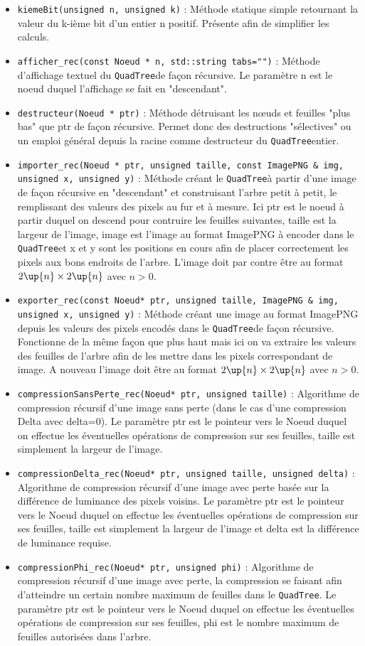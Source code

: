 \documentclass{article}
\newcommand{\info}{\texttt}
\newcommand{\qt}{\info{QuadTree}}
\begin{document}
	    \begin{itemize}
	    	\item \info{kiemeBit(unsigned n, unsigned k)} : Méthode statique simple retournant la valeur du k-ième bit d'un entier n positif. Présente afin de simplifier les calculs.
	    	\item \info{afficher_rec(const Noeud * n, std::string tabs="")} : Méthode d'affichage textuel du \qt de façon récursive. Le paramètre n est le noeud duquel l'affichage se fait en "descendant".
	    	\item \info{destructeur(Noeud * ptr)} : Méthode détruisant les nœuds et feuilles "plus bas" que ptr de façon récursive. Permet donc des destructions "sélectives" ou un emploi général depuis la racine comme destructeur du \qt entier.
	    	\item \info{importer_rec(Noeud * ptr, unsigned taille, const ImagePNG \& img, unsigned x, unsigned y)} : Méthode créant le \qt à partir d'une image de façon récursive en "descendant" et construisant l'arbre petit à petit, le remplissant des valeurs des pixels au fur et à mesure. Ici ptr est le noeud à partir duquel on descend pour contruire les feuilles suivantes, taille est la largeur de l'image, image est l'image au format ImagePNG à encoder dans le \qt et x et y sont les positions en cours afin de placer correctement les pixels aux bons endroits de l'arbre. L'image doit par contre être au format $2\up{n}\times2\up{n}$ avec $n>0$.
	    	\item \info{exporter_rec(const Noeud* ptr, unsigned taille, ImagePNG \& img, unsigned x, unsigned y)} : Méthode créant une image au format ImagePNG depuis les valeurs des pixels encodés dans le \qt de façon récursive. Fonctionne de la même façon que plus haut mais ici on va extraire les valeurs des feuilles de l'arbre afin de les mettre dans les pixels correspondant de image. A nouveau l'image doit être au format $2\up{n}\times2\up{n}$ avec $n>0$.
	    	\item \info{compressionSansPerte_rec(Noeud* ptr, unsigned taille)} : Algorithme de compression récursif d'une image sans perte (dans le cas d'une compression Delta avec delta=0). Le paramètre ptr est le pointeur vers le Noeud duquel on effectue les éventuelles opérations de compression sur ses feuilles, taille est simplement la largeur de l'image.
	    	\item \info{compressionDelta_rec(Noeud* ptr, unsigned taille, unsigned delta)} : Algorithme de compression récursif d'une image avec perte basée sur la différence de luminance des pixels voisins. Le paramètre ptr est le pointeur vers le Noeud duquel on effectue les éventuelles opérations de compression sur ses feuilles, taille est simplement la largeur de l'image et delta est la différence de luminance requise.
	    	\item \info{compressionPhi_rec(Noeud* ptr, unsigned phi)} : Algorithme de compression récursif d'une image avec perte, la compression se faisant afin d'atteindre un certain nombre maximum de feuilles dans le \qt. Le paramètre ptr est le pointeur vers le Noeud duquel on effectue les éventuelles opérations de compression sur ses feuilles, phi est le nombre maximum de feuilles autorisées dans l'arbre.
	    \end{itemize}
    
\end{document}
